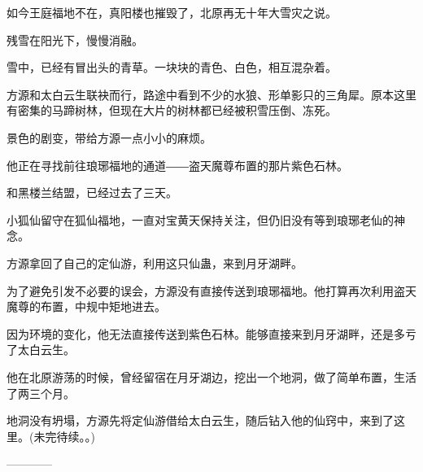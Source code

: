 \begin{this_body}
如今王庭福地不在，真阳楼也摧毁了，北原再无十年大雪灾之说。

残雪在阳光下，慢慢消融。

雪中，已经有冒出头的青草。一块块的青色、白色，相互混杂着。

方源和太白云生联袂而行，路途中看到不少的水狼、形单影只的三角犀。原本这里有密集的马蹄树林，但现在大片的树林都已经被积雪压倒、冻死。

景色的剧变，带给方源一点小小的麻烦。

他正在寻找前往琅琊福地的通道――盗天魔尊布置的那片紫色石林。

和黑楼兰结盟，已经过去了三天。

小狐仙留守在狐仙福地，一直对宝黄天保持关注，但仍旧没有等到琅琊老仙的神念。

方源拿回了自己的定仙游，利用这只仙蛊，来到月牙湖畔。

为了避免引发不必要的误会，方源没有直接传送到琅琊福地。他打算再次利用盗天魔尊的布置，中规中矩地进去。

因为环境的变化，他无法直接传送到紫色石林。能够直接来到月牙湖畔，还是多亏了太白云生。

他在北原游荡的时候，曾经留宿在月牙湖边，挖出一个地洞，做了简单布置，生活了两三个月。

地洞没有坍塌，方源先将定仙游借给太白云生，随后钻入他的仙窍中，来到了这里。(未完待续。。)

------------

\end{this_body}

